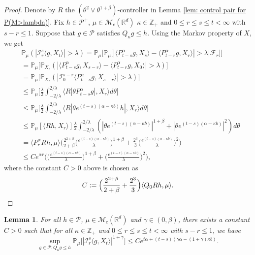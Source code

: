 \documentclass[12pt,a4paper]{amsart}
\theoremstyle{plain}
\newtheorem{lem}[thm]{Lemma}
\theoremstyle{definition}
\numberwithin{equation}{section}
\begin{document}
\begin{proof}
    Denote by $R$ the $(\theta^2\vee\theta^{1+\beta})$-controller in Lemma \ref{lem: control pair for P(M>lambda)}.
    Fix $h \in \mathcal P^+$, $\mu \in \mathcal M_c(\mathbb R^d)$ $\kappa \in \mathbb Z_+ $ and $0\leq r\leq s\leq t < \infty$ with $s-r \leq 1$.
    Suppose that $g\in \mathcal P$ satisfies $Q_\kappa g \leq h$.
    Using the Markov property of $X$, we get
\begin{align}
    &\mathbb P_{\mu}(|\mathcal I_r^s\langle g, X_t\rangle|>\lambda)
    = \mathbb P_\mu \Big[\mathbb P_\mu\big[|\langle P_{t-s}^\alpha g, X_{s}\rangle - \langle P_{t-r}^\alpha g, X_{r}\rangle|> \lambda\big| \mathscr F_r\big]\Big]
    \\&= \mathbb P_\mu \big[\mathbb P_{X_r}(|\langle P_{t-s}^\alpha g, X_{s-r}\rangle - \langle P_{t-r}^\alpha g, X_{0}\rangle|> \lambda)\big]
    \\&= \mathbb P_\mu \big[\mathbb P_{X_r}(|\mathcal I_0^{s-r}\langle P_{t-s}^\alpha g, X_{s-r}\rangle |> \lambda)\big]
    \\&\leq \mathbb P_\mu \Big[ \frac{\lambda}{2}\int_{-2/\lambda}^{2/\lambda}\langle R|\theta P^\alpha_{t-s}g|,X_r\rangle d\theta \Big]
    \\&\leq \mathbb P_\mu \Big[ \frac{\lambda}{2}\int_{-2/\lambda}^{2/\lambda}\langle R|\theta e^{(t-s)(\alpha- \kappa b)}h|,X_r\rangle d\theta \Big]
    \\&\leq \mathbb P_\mu [ \langle Rh,X_r\rangle ] \frac{\lambda}{2}\int_{-2/\lambda}^{2/\lambda}(|\theta e^{(t-s)(\alpha- \kappa b)}|^{1+\beta} + |\theta e^{(t-s)(\alpha- \kappa b)}|^{2})d\theta
    \\& =  \langle P_r^\alpha Rh,\mu\rangle \bigg(  \frac{2^{2+\beta}}{2+\beta}\Big(\frac{e^{(t-s)(\alpha- \kappa b)}}{\lambda}\Big)^{1+\beta} + \frac{2^{3}}{3}\Big(\frac{e^{(t-s)(\alpha- \kappa b)}}{\lambda}\Big)^2\bigg)
    \\ & \leq C e^{\alpha r} \bigg(\Big( \frac{e^{(t-s)(\alpha - \kappa b)}}{\lambda}\Big)^{1+\beta} + \Big( \frac{e^{(t-s)(\alpha - \kappa b)}}{\lambda}\Big)^{2} \bigg),
\end{align}
    where the constant $C>0$ above is chosen as
\[
    C := \Big(\frac{2^{2+\beta}}{2+\beta} + \frac{2^{3}}{3} \Big)\langle Q_0Rh, \mu\rangle.
    \qedhere
\]
\end{proof}

\begin{lem}
\label{lem: control of mgtrs}
    For all $h \in \mathcal P$, $\mu \in \mathcal M_c(\mathbb R^d)$ and $\gamma\in (0, \beta)$, there exists a constant $C > 0$ such that for all $\kappa \in \mathbb Z_+$ and $0\leq r\leq s\leq t<\infty$ with $s-r \leq 1$, we have
\[
    \sup_{g \in \mathcal P: Q_\kappa g\leq h} \mathbb P_\mu\big[|\mathcal I_r^s\langle g, X_t\rangle|^{1+\gamma}\big]
    \leq C e^{t\alpha+(t-s) (\gamma\alpha- (1+\gamma)\kappa b)}.
\]
\end{lem}
\end{document}
